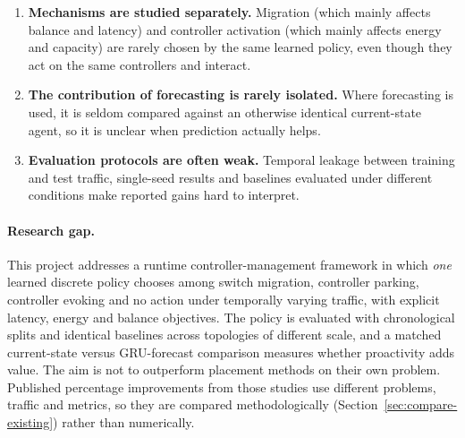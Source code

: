 \begin{enumerate}[leftmargin=*]
  \item \textbf{Mechanisms are studied separately.} Migration (which mainly affects balance and latency) and controller activation (which mainly affects energy and capacity) are rarely chosen by the same learned policy, even though they act on the same controllers and interact.
  \item \textbf{The contribution of forecasting is rarely isolated.} Where forecasting is used, it is seldom compared against an otherwise identical current-state agent, so it is unclear when prediction actually helps.
  \item \textbf{Evaluation protocols are often weak.} Temporal leakage between training and test traffic, single-seed results and baselines evaluated under different conditions make reported gains hard to interpret.
\end{enumerate}

\paragraph{Research gap.} This project addresses a runtime controller-management framework in which \emph{one} learned discrete policy chooses among switch migration, controller parking, controller evoking and no action under temporally varying traffic, with explicit latency, energy and balance objectives. The policy is evaluated with chronological splits and identical baselines across topologies of different scale, and a matched current-state versus GRU-forecast comparison measures whether proactivity adds value. The aim is not to outperform placement methods on their own problem. Published percentage improvements from those studies use different problems, traffic and metrics, so they are compared methodologically (Section~\ref{sec:compare-existing}) rather than numerically.
